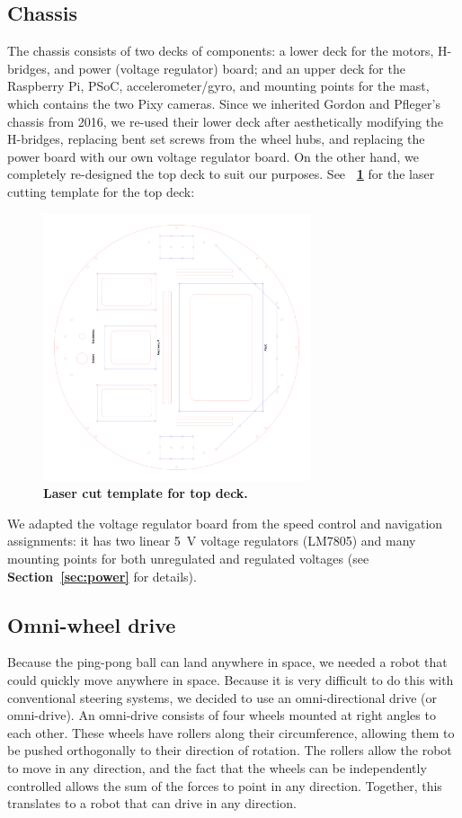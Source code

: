 \documentclass[letterpaper, 11pt]{article}
\newcommand*{\figref}[1]{\textbf{\figurename~\ref{#1}}}
\newcommand*{\secref}[1]{\textbf{Section~\ref{#1}}}
\begin{document}
\subsection{Chassis}
The chassis consists of two decks of components: a lower deck for the motors, H-bridges, and power (voltage regulator) board; and an upper deck for the Raspberry Pi, PSoC, accelerometer/gyro, and mounting points for the mast, which contains the two Pixy cameras. Since we inherited Gordon and Pfleger's chassis from 2016, we re-used their lower deck after aesthetically modifying the H-bridges, replacing bent set screws from the wheel hubs, and replacing the power board with our own voltage regulator board. On the other hand, we completely re-designed the top deck to suit our purposes. See \figref{fig:topdeck} for the laser cutting template for the top deck:
\begin{figure}[ht]
    \centering
    \includegraphics[width=0.7\textwidth]{images/topdeck.png}
    \caption{\textbf{Laser cut template for top deck.}}
    \label{fig:topdeck}
\end{figure}

We adapted the voltage regulator board from the speed control and navigation assignments: it has two linear \SI{5}{V} voltage regulators (LM7805) and many mounting points for both unregulated and regulated voltages (see \secref{sec:power} for details).

\subsection{Omni-wheel drive}
Because the ping-pong ball can land anywhere in space, we needed a robot that could quickly move anywhere in space. Because it is very difficult to do this with conventional steering systems, we decided to use an omni-directional drive (or omni-drive). An omni-drive consists of four wheels mounted at right angles to each other. These wheels have rollers along their circumference, allowing them to be pushed orthogonally to their direction of rotation. The rollers allow the robot to move in any direction, and the fact that the wheels can be independently controlled allows the sum of the forces to point in any direction. Together, this translates to a robot that can drive in any direction.
\end{document}
